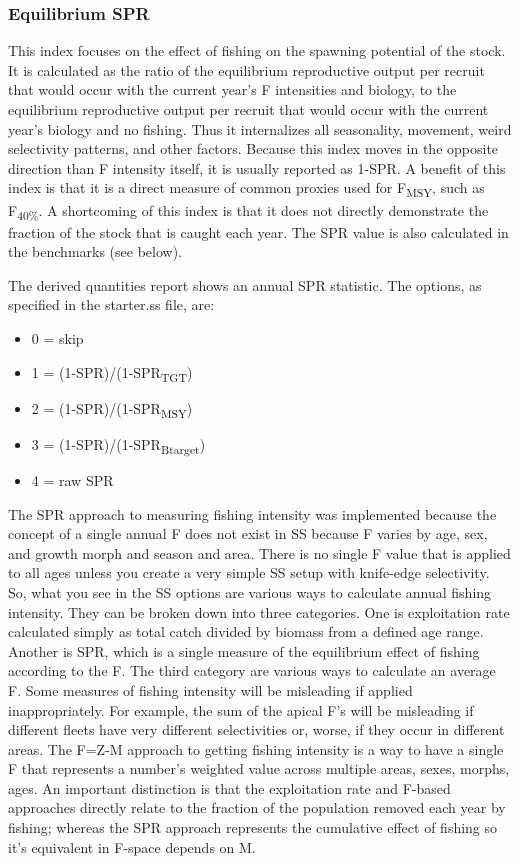 \subsubsection{Equilibrium SPR}
This index focuses on the effect of fishing on the spawning potential of the stock. It is calculated as the ratio of the equilibrium reproductive output per recruit that would occur with the current year's F intensities and biology, to the equilibrium reproductive output per recruit that would occur with the current year's biology and no fishing.  Thus it internalizes all seasonality, movement, weird selectivity patterns, and other factors. Because this index moves in the opposite direction than F intensity itself, it is usually reported as 1-SPR. A benefit of this index is that it is a direct measure of common proxies used for F\textsubscript{MSY}, such as F\textsubscript {40\%}. A shortcoming of this index is that it does not directly demonstrate the fraction of the stock that is caught each year. The SPR value is also calculated in the benchmarks (see below). 

The derived quantities report shows an annual SPR statistic.  The options, as specified in the starter.ss file, are:
\begin{itemize}
	\item 0 = skip
	\item 1 = (1-SPR)/(1-SPR\textsubscript{TGT})
	\item 2 = (1-SPR)/(1-SPR\textsubscript{MSY})
	\item 3 = (1-SPR)/(1-SPR\textsubscript{Btarget})
	\item 4 = raw SPR
\end{itemize}

The SPR approach to measuring fishing intensity was implemented because the concept of a single annual F does not exist in SS because F varies by age, sex, and growth morph and season and area.  There is no single F value that is applied to all ages unless you create a very simple SS setup with knife-edge selectivity.  So, what you see in the SS options are various ways to calculate annual fishing intensity.  They can be broken down into three categories.  One is exploitation rate calculated simply as total catch divided by biomass from a defined age range. Another is SPR, which is a single measure of the equilibrium effect of fishing according to the F.  The third category are various ways to calculate an average F. Some measures of fishing intensity will be misleading if applied inappropriately. For example, the sum of the apical F's will be misleading if different fleets have very different selectivities or, worse, if they occur in different areas. The F=Z-M approach to getting fishing intensity is a way to have a single F that represents a number's weighted value across multiple areas, sexes, morphs, ages. An important distinction is that the exploitation rate and F-based approaches directly relate to the fraction of the population removed each year by fishing; whereas the SPR approach represents the cumulative effect of fishing so it's equivalent in F-space depends on M.

